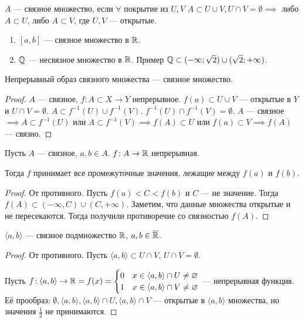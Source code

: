 \begin{definition}
    $A$ --- связное множество, если  $\forall$ покрытие из $U, V$  $A \subset U \cup V, U \cap V = \emptyset \implies $ либо  $A \subset U$, либо  $A \subset V$, где $U, V$ --- открытые.
\end{definition}
\begin{example}
    \begin{enumerate}
        \item $[a, b]$ --- связное множество в  $\mathbb{R}$.
        \item  $\mathbb{Q}$ --- несвязное множество в  $\mathbb{R}$. Пример  $\mathbb{Q} \subset (-\infty; \sqrt{2}) \cup (\sqrt{2}; +\infty)$.
    \end{enumerate}
\end{example}
\begin{theorem}
    Непрерывный образ связного множества --- связное множество.
\end{theorem}
\begin{proof}
    $A$ --- связное,  $f\!: A \subset X \to Y$ непрерывное.  $f(a) \subset U \cup V$ --- открытые в  $Y$ и  $U \cap V = \emptyset$.  $A \subset f^{-1}(U) \cup f^{-1}(V)$.  $f^{-1}(U) \cap f^{-1}(V) = \emptyset$.  $A$ --- связное  $\implies A \subset f^{-1}(U)$ или  $A \subset f^{-1}(V) \implies f(A) \subset U$ или  $f(a) \subset V \implies f(A)$ --- связно.
\end{proof}
\begin{consequence}
    Пусть $A$ --- связное, $a, b \in A$. $f\!: A \to \mathbb{R}$ непрерывная. 

    Тогда  $f$ принимает все промежуточные значения, лежащие между  $f(a)$ и  $f(b)$.
\end{consequence}
\begin{proof}
    От противного. Пусть $f(a) < C < f(b)$ и $C$ --- не значение. Тогда  $f(A) \subset (-\infty, C) \cup (C, +\infty)$. Заметим, что данные множества открытые и не пересекаются. Тогда получили противоречие со связностью  $f(A)$.
\end{proof}
\begin{theorem}
    $\langle a, b \rangle$ --- связное подмножество  $\mathbb{R}$,  $a, b \in \overline{\mathbb{R}}$.
\end{theorem}
\begin{proof}
    От противного. Пусть $\langle a, b \rangle \subset U \cap V$,  $U \cap V = \emptyset$. 

    Пусть  $f\!: \langle a, b \rangle \to \mathbb{R} = f(x) = \begin{cases} 0 & x \in \langle a, b \rangle \cap U \neq \varnothing \\ 1 & x \in \langle a, b \rangle \cap V \neq \varnothing \end{cases}$ --- непрерывная функция. Её прообраз:  $\emptyset, \langle a, b \rangle, \langle a, b \rangle \cap U, \langle a, b \rangle \cap V$ --- открытые в  $\langle a, b \rangle$ множества, но значения  $\frac{1}{2}$ не принимаются.
\end{proof}
